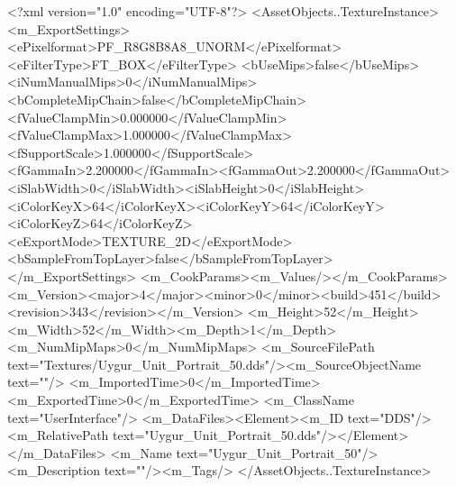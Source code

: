 <?xml version="1.0" encoding="UTF-8"?>
<AssetObjects..TextureInstance>
  <m_ExportSettings>
    <ePixelformat>PF_R8G8B8A8_UNORM</ePixelformat><eFilterType>FT_BOX</eFilterType>
    <bUseMips>false</bUseMips><iNumManualMips>0</iNumManualMips><bCompleteMipChain>false</bCompleteMipChain>
    <fValueClampMin>0.000000</fValueClampMin><fValueClampMax>1.000000</fValueClampMax><fSupportScale>1.000000</fSupportScale>
    <fGammaIn>2.200000</fGammaIn><fGammaOut>2.200000</fGammaOut><iSlabWidth>0</iSlabWidth><iSlabHeight>0</iSlabHeight>
    <iColorKeyX>64</iColorKeyX><iColorKeyY>64</iColorKeyY><iColorKeyZ>64</iColorKeyZ>
    <eExportMode>TEXTURE_2D</eExportMode><bSampleFromTopLayer>false</bSampleFromTopLayer>
  </m_ExportSettings>
  <m_CookParams><m_Values/></m_CookParams>
  <m_Version><major>4</major><minor>0</minor><build>451</build><revision>343</revision></m_Version>
  <m_Height>52</m_Height><m_Width>52</m_Width><m_Depth>1</m_Depth><m_NumMipMaps>0</m_NumMipMaps>
  <m_SourceFilePath text="Textures/Uygur_Unit_Portrait_50.dds"/><m_SourceObjectName text=""/>
  <m_ImportedTime>0</m_ImportedTime><m_ExportedTime>0</m_ExportedTime>
  <m_ClassName text="UserInterface"/>
  <m_DataFiles><Element><m_ID text="DDS"/><m_RelativePath text="Uygur_Unit_Portrait_50.dds"/></Element></m_DataFiles>
  <m_Name text="Uygur_Unit_Portrait_50"/><m_Description text=""/><m_Tags/>
</AssetObjects..TextureInstance>

